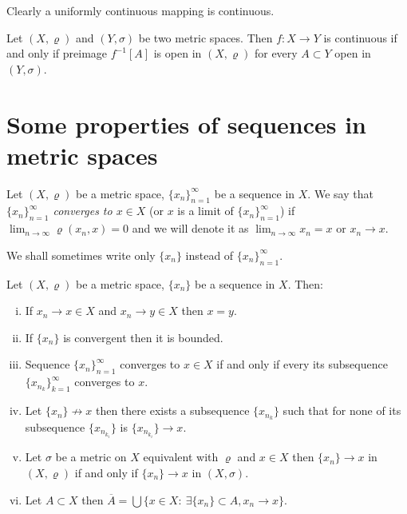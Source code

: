 Clearly a uniformly continuous mapping is continuous.

\begin{theorem}\label{th:contop}
	Let $(X,\varrho)$ and $(Y,\sigma)$ be two metric spaces. Then $f:X\to Y$ is continuous if and only if preimage $f^{-1}[A]$ is open in $(X,\varrho)$ for every $A\subset Y$ open in $(Y,\sigma)$.
\end{theorem}

\section{Some properties of sequences in metric spaces}

\begin{define}\label{def:consq}
Let $(X,\varrho)$ be a metric space, $\{x_n\}_{n=1}^\infty$ be a sequence in $X$. We say that \emph{$\{x_n\}_{n=1}^\infty$ converges to $x\in X$} (or $x$ is a limit of $\{x_n\}_{n=1}^\infty$) if $\lim_{n\to\infty}\varrho(x_n,x)=0$ and we will denote it as $\lim_{n\to\infty}x_n=x$ or $x_n\to x$.
\end{define}

We shall sometimes write only $\{x_n\}$ instead of $\{x_n\}_{n=1}^\infty$.

\begin{theorem} \label{th:mpseq}
Let $(X,\varrho)$ be a metric space, $\{x_n\}$ be a sequence in $X$. Then:
\begin{enumerate}[(i)]
	\item If $x_n\to x\in X$ and $x_n\to y\in X$ then $x=y$.
	\item If $\{x_n\}$ is convergent then it is bounded.
	\item Sequence $\{x_n\}_{n=1}^\infty$ converges to $x\in X$ if and only if every its subsequence $\{x_{n_k}\}_{k=1}^\infty$ converges to $x$.
	\item Let $\{x_n\}\not\to x$ then there exists a subsequence $\{x_{n_k}\}$ such that for none of its subsequence $\{x_{n_{k_i}}\}$ is $\{x_{n_{k_i}}\}\to x$.
	\item Let $\sigma$ be a metric on $X$ equivalent with $\varrho$ and $x\in X$ then $\{x_n\}\to x$ in $(X,\varrho)$ if and only if $\{x_n\}\to x$ in $(X,\sigma)$.
	\item Let $A\subset X$ then $\overline{A} = \bigcup\{x\in X:\ \exists\{x_n\}\subset A, x_n\to x\}$.
\end{enumerate}
\end{theorem} 

